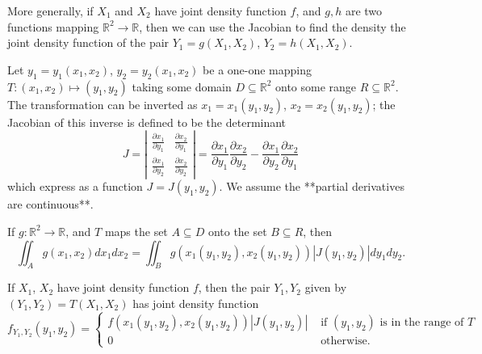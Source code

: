 More generally, if $X_1$ and $X_2$ have joint density function $f$, and $g, h$ are two functions mapping $\mathbb{R}^2 \to \mathbb{R}$, then we can use the Jacobian to find the density the joint density function of the pair $Y_1 = g(X_1 , X_2)$, $Y_2 = h(X_1 , X_2)$. 

Let $y_1 = y_1 (x_1 , x_2)$, $y_2 = y_2(x_1 , x_2)$ 
be a one-one mapping $T : (x_1 , x_2) \mapsto (y_1 , y_2)$ taking some domain $D \subseteq \mathbb{R}^2$ onto some 
range $R \subseteq \mathbb{R}^2$. The transformation can be inverted as $x_1 = x_1(y_1 , y_2)$, $x_2 = x_2(y_1 , y_2)$; the Jacobian of this inverse is defined to be the determinant 
\begin{equation*}
    J=\left|\begin{array}{ll}{\frac{\partial x_{1}}{\partial y_{1}}} & {\frac{\partial x_{2}}{\partial y_{1}}} \\ {\frac{\partial x_{1}}{\partial y_{2}}} & {\frac{\partial x_{2}}{\partial y_{2}}}\end{array}\right|=\frac{\partial x_{1}}{\partial y_{1}} \frac{\partial x_{2}}{\partial y_{2}}-\frac{\partial x_{1}}{\partial y_{2}} \frac{\partial x_{2}}{\partial y_{1}}
\end{equation*}
which express as a function $J = J(y_1, y_2)$. We assume the **partial derivatives are continuous**.

\begin{theorem}
If $g : \mathbb{R}^2 \to \mathbb{R}$, and $T$ maps the set $A \subseteq D$ onto the set $B \subseteq R$, then 
\begin{equation*}
    \iint_{A} g\left(x_{1}, x_{2}\right) d x_{1} d x_{2}=\iint_{B} g\left(x_{1}\left(y_{1}, y_{2}\right), x_{2}\left(y_{1}, y_{2}\right)\right)\left|J\left(y_{1}, y_{2}\right)\right| d y_{1} d y_{2}.
\end{equation*}
\end{theorem}

\begin{corollary}
If $X_1$, $X_2$ have joint density function $f$, then the pair $Y_1,Y_2$ given by $(Y_1 , Y_2) = T (X_1, X_2)$ has joint density function 
\begin{equation*}
    f_{Y_{1}, Y_{2}}\left(y_{1}, y_{2}\right)=\left\{\begin{array}{ll}{f\left(x_{1}\left(y_{1}, y_{2}\right), x_{2}\left(y_{1}, y_{2}\right)\right)\left|J\left(y_{1}, y_{2}\right)\right|} & {\text { if }\left(y_{1}, y_{2}\right) \text { is in the range of } T} \\ {0} & {\text { otherwise. }}\end{array}\right.
\end{equation*}
\end{corollary}


